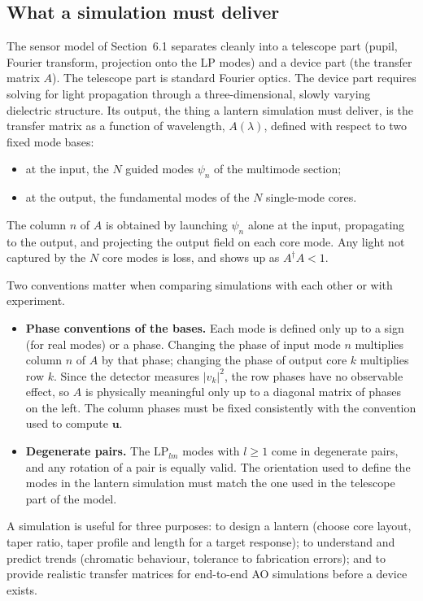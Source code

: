 \documentclass[11pt,a4paper]{article}
\newcommand{\uvec}{\mathbf{u}}
\begin{document}
\subsection{What a simulation must deliver}
The sensor model of Section~6.1 separates cleanly into a telescope part (pupil, Fourier transform, projection onto the LP modes) and a device part (the transfer matrix $A$). The telescope part is standard Fourier optics. The device part requires solving for light propagation through a three-dimensional, slowly varying dielectric structure. Its output, the thing a lantern simulation must deliver, is the transfer matrix as a function of wavelength, $A(\lambda)$, defined with respect to two fixed mode bases:
\begin{itemize}
\item at the input, the $N$ guided modes $\psi_n$ of the multimode section;
\item at the output, the fundamental modes of the $N$ single-mode cores.
\end{itemize}
The column $n$ of $A$ is obtained by launching $\psi_n$ alone at the input, propagating to the output, and projecting the output field on each core mode. Any light not captured by the $N$ core modes is loss, and shows up as $A^\dagger A < 1$.

Two conventions matter when comparing simulations with each other or with experiment.
\begin{itemize}
\item \textbf{Phase conventions of the bases.} Each mode is defined only up to a sign (for real modes) or a phase. Changing the phase of input mode $n$ multiplies column $n$ of $A$ by that phase; changing the phase of output core $k$ multiplies row $k$. Since the detector measures $|v_k|^2$, the row phases have no observable effect, so $A$ is physically meaningful only up to a diagonal matrix of phases on the left. The column phases must be fixed consistently with the convention used to compute $\uvec$.
\item \textbf{Degenerate pairs.} The $\mathrm{LP}_{lm}$ modes with $l \geq 1$ come in degenerate pairs, and any rotation of a pair is equally valid. The orientation used to define the modes in the lantern simulation must match the one used in the telescope part of the model.
\end{itemize}
A simulation is useful for three purposes: to design a lantern (choose core layout, taper ratio, taper profile and length for a target response); to understand and predict trends (chromatic behaviour, tolerance to fabrication errors); and to provide realistic transfer matrices for end-to-end AO simulations before a device exists.
\end{document}
